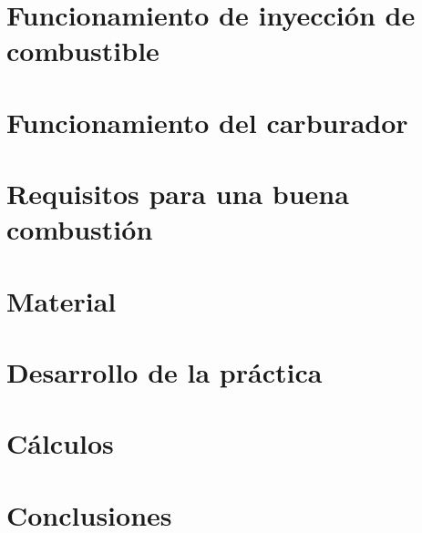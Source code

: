 \documentclass{article}
\begin{document}
    \section{Funcionamiento de inyecci\'{o}n de combustible}
    \section{Funcionamiento del carburador}
    \section{Requisitos para una buena combusti\'{o}n}
    \section{Material}
    \section{Desarrollo de la pr\'{a}ctica}
    \section{C\'{a}lculos}
    \section{Conclusiones}

    
\end{document}
